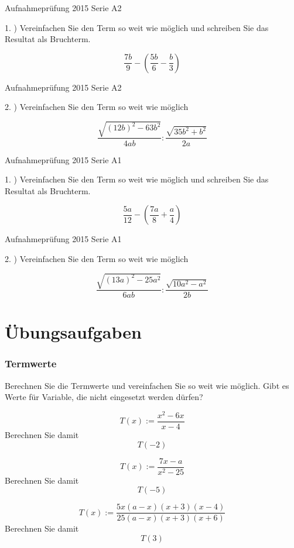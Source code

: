 Aufnahmeprüfung 2015 Serie A2

1. ) Vereinfachen Sie den Term so weit wie möglich und schreiben Sie
das Resultat als Bruchterm.

$$\frac{7b}9 - \left( \frac{5b}6 - \frac{b}3 \right)$$

Aufnahmeprüfung 2015 Serie A2

2. ) Vereinfachen Sie den Term so weit wie möglich

$$\frac{\sqrt{(12b)^2 - 63b^2}}{4ab} : \frac{\sqrt{35b^2 + b^2}}{2a}$$

Aufnahmeprüfung 2015 Serie A1

1. ) Vereinfachen Sie den Term so weit wie möglich und schreiben Sie
das Resultat als Bruchterm.

$$\frac{5a}{12} - \left( \frac{7a}8 + \frac{a}4 \right)$$

Aufnahmeprüfung 2015 Serie A1

2. ) Vereinfachen Sie den Term so weit wie möglich

$$\frac{\sqrt{(13a)^2 - 25a^2}}{6ab} : \frac{\sqrt{10a^2 - a^2}}{2b}$$

\newpage


\part{Übungsaufgaben}

\section{Termwerte}
Berechnen Sie die Termwerte und vereinfachen Sie so weit wie
möglich. Gibt es Werte für Variable, die nicht eingesetzt werden dürfen?

\nextBbwAufgabenNummer{}
\begin{bbwAufgabenBlock}
\item $$T(x) := \frac{x^2-6x}{x-4}$$
Berechnen Sie damit
$$T(-2)$$

\item $$T(x):=\frac{7x-a}{x^2-25}$$
Berechnen Sie damit
$$T(-5)$$

\item $$T(x):= \frac{5x(a-x)(x+3)(x-4)}{25(a-x)(x+3)(x+6)}$$
Berechnen Sie damit
$$T(3)$$
\end{bbwAufgabenBlock}

